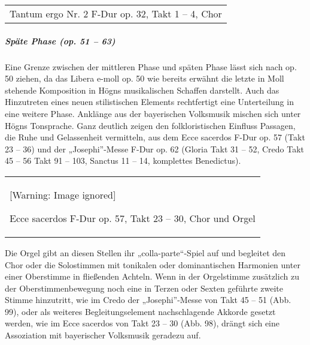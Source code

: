 \begin{center}
\tablefirsthead{}
\tablehead{}
\tabletail{}
\tablelasttail{}
\begin{supertabular}{m{8.399cm}}
{%
 \par}
Tantum ergo Nr. 2 F-Dur op. 32, Takt 1
– 4, Chor\\
\end{supertabular}
\end{center}
\subparagraph[Späte Phase (op. 51 – 63)]{Späte Phase (op. 51 – 63)}
Eine Grenze zwischen der mittleren Phase und späten Phase lässt sich
nach op. 50 ziehen, da das Libera e-moll op. 50 wie bereits erwähnt die
letzte in Moll stehende Komposition in Högns musikalischen Schaffen
darstellt. Auch das Hinzutreten eines neuen stilistischen Elements
rechtfertigt eine Unterteilung in eine weitere Phase. Anklänge aus der
bayerischen Volksmusik mischen sich unter Högns Tonsprache. Ganz
deutlich zeigen den folkloristischen Einfluss Passagen, die Ruhe und
Gelassenheit vermitteln, aus dem Ecce sacerdos F-Dur op. 57 (Takt 23 –
36) und der „Josephi”-Messe F-Dur op. 62 (Gloria Takt 31 – 52, Credo
Takt 45 – 56 Takt 91 – 103, Sanctus 11 – 14, komplettes Benedictus).

\begin{center}
\tablefirsthead{}
\tablehead{}
\tabletail{}
\tablelasttail{}
\begin{supertabular}{m{12.034cm}}
  [Warning: Image ignored] %

\label{bkm:Ref99948828}Ecce sacerdos
F-Dur op. 57, Takt 23 – 30, Chor und Orgel\\
\end{supertabular}
\end{center}
Die Orgel gibt an diesen Stellen ihr „colla-parte“-Spiel auf und
begleitet den Chor \newline
oder die Solostimmen mit tonikalen oder dominantischen Harmonien unter
einer \newline
Oberstimme in fließenden Achteln. Wenn in der Orgelstimme zusätzlich zu
der \newline
Oberstimmenbewegung noch eine in Terzen oder Sexten geführte zweite
Stimme hinzutritt, wie im Credo der „Josephi”-Messe von Takt 45 – 51
(Abb. 99), oder als weiteres Begleitungselement nachschlagende Akkorde
gesetzt werden, wie im Ecce sacerdos von Takt 23 – 30 (Abb. 98), drängt
sich eine Assoziation mit bayerischer Volksmusik geradezu auf.

